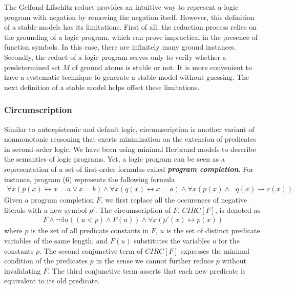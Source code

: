 The Gelfond-Lifschitz reduct provides an intuitive way to represent a logic 
program with negation by removing the negation itself. However, this definition 
of a stable models has its limitations. First of all, the reduction process relies 
on the grounding of a logic program, which can prove impractical in the presence of 
function symbols. In this case, there are infinitely many ground instances. 
Secondly, the reduct of a logic program serves only to verify whether a predetermined 
set $M$ of ground atoms is stable or not. It is more convenient to have a systematic 
technique to generate a stable model without guessing. The next definition of a stable 
model helps offset these limitations.

\subsubsection{Circumscription}
Similar to autoepistemic and default logic, circumscription is another variant of 
nonmonotonic reasoning that exerts minimization on the extension of predicates in 
second-order logic. We have been using minimal Herbrand models to describe the semantics 
of logic programs. Yet, a logic program can be seen as a representation of a set of 
first-order formulas called \textbf{\emph{program completion}}. For instance, program (6) 
represents the following formula
\begin{align}
    \forall x (p(x) \leftrightarrow x = a \lor x = b) \land 
    \forall x (q(x) \leftrightarrow x = a) \land 
    \forall x (p(x) \land \neg q(x) \rightarrow r(x))
\end{align}
Given a program completion $F$, we first replace all the occurences of negative literals 
with a new symbol $p'$. The circumscription of $F$, $CIRC[F]$, is denoted as 
\begin{align}
    F \land \neg \exists u((u < p) \land F(u)) \land \forall x (p'(x) \leftrightarrow p(x))
\end{align}
where $p$ is the set of all predicate constants in $F$, $u$ is the set of distinct 
predicate variables of the same length, and $F(u)$ substitutes the variables $u$ for 
the constants $p$. The second conjunctive term of $CIRC[F]$ expresses the minimal 
condition of the predicates $p$ in the sense we cannot further reduce $p$ without 
invalidating $F$. The third conjunctive term asserts that each new predicate is 
equivalent to its old predicate.

